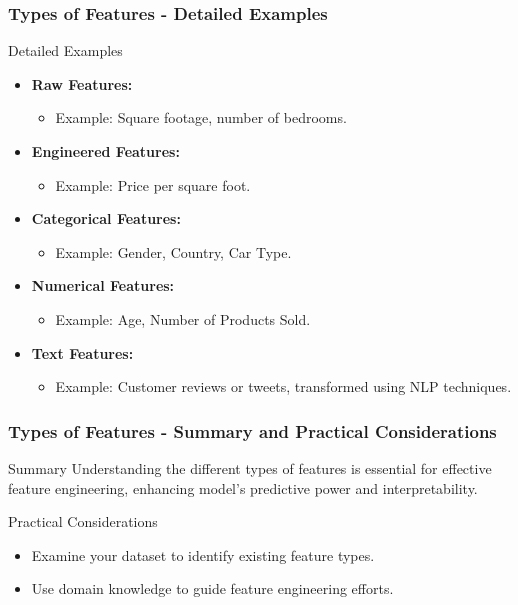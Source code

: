 \documentclass[aspectratio=169]{beamer}
\begin{document}
\begin{frame}[fragile]
    \frametitle{Types of Features - Detailed Examples}
    \begin{block}{Detailed Examples}
        \begin{itemize}
            \item \textbf{Raw Features:} 
                \begin{itemize}
                    \item Example: Square footage, number of bedrooms.
                \end{itemize}
            \item \textbf{Engineered Features:} 
                \begin{itemize}
                    \item Example: Price per square foot.
                \end{itemize}
            \item \textbf{Categorical Features:} 
                \begin{itemize}
                    \item Example: Gender, Country, Car Type.
                \end{itemize}
            \item \textbf{Numerical Features:} 
                \begin{itemize}
                    \item Example: Age, Number of Products Sold.
                \end{itemize}
            \item \textbf{Text Features:} 
                \begin{itemize}
                    \item Example: Customer reviews or tweets, transformed using NLP techniques.
                \end{itemize}
        \end{itemize}
    \end{block}
\end{frame}

\begin{frame}[fragile]
    \frametitle{Types of Features - Summary and Practical Considerations}
    \begin{block}{Summary}
        Understanding the different types of features is essential for effective feature engineering, enhancing model's predictive power and interpretability.
    \end{block}
    
    \begin{block}{Practical Considerations}
        \begin{itemize}
            \item Examine your dataset to identify existing feature types.
            \item Use domain knowledge to guide feature engineering efforts.
        \end{itemize}
    \end{block}
\end{frame}
\end{document}
